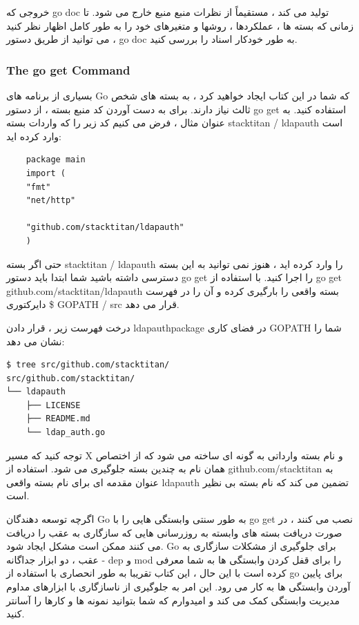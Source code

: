 \documentclass[12pt]{book}
\begin{document}
خروجی که go doc تولید می کند ، مستقیماً از نظرات منبع منبع خارج می شود.
تا زمانی که بسته ها ، عملکردها ، روشها و متغیرهای خود را به طور کامل اظهار نظر کنید ، می توانید از طریق دستور go doc به طور خودکار اسناد را بررسی کنید.
\subsubsection{The go get Command}
بسیاری از برنامه های Go که شما در این کتاب ایجاد خواهید کرد ، به بسته های شخص ثالث نیاز دارند.
برای به دست آوردن کد منبع بسته ، از دستور go get استفاده کنید.
به عنوان مثال ، فرض می کنیم کد زیر را که واردات بسته stacktitan / ldapauth است وارد کرده اید:
\begin{latin}
	\begin{lstlisting}
	package main
	import (
	"fmt"
	"net/http"

	"github.com/stacktitan/ldapauth"
	)
	\end{lstlisting}
\end{latin}

حتی اگر بسته stacktitan / ldapauth را وارد کرده اید ، هنوز نمی توانید به این بسته دسترسی داشته باشید
شما ابتدا باید دستور go get را اجرا کنید.
با استفاده از go get github.com/stacktitan/ldapauth بسته واقعی را بارگیری کرده و آن را در فهرست دایرکتوری \$ GOPATH / src قرار می دهد.

درخت فهرست زیر ، قرار دادن ldapauthpackage در فضای کاری GOPATH شما را نشان می دهد:
\begin{latin}
	\begin{lstlisting}
$ tree src/github.com/stacktitan/
src/github.com/stacktitan/
└── ldapauth
	├── LICENSE
	├── README.md
	└── ldap_auth.go
	\end{lstlisting}
\end{latin}

توجه کنید که مسیر X و نام بسته وارداتی به گونه ای ساخته می شود که از اختصاص همان نام به چندین بسته جلوگیری می شود.
استفاده از github.com/stacktitan به عنوان مقدمه ای برای نام بسته واقعی ldapauth تضمین می کند که نام بسته بی نظیر است.

اگرچه توسعه دهندگان Go به طور سنتی وابستگی هایی را با go get نصب می کنند ، در صورت دریافت بسته های وابسته به روزرسانی هایی که سازگاری به عقب را دریافت می کنند ممکن است مشکل ایجاد شود.
Go برای جلوگیری از مشکلات سازگاری به عقب ، دو ابزار جداگانه - dep و mod را برای قفل کردن وابستگی ها به شما معرفی کرده است
با این حال ، این کتاب تقریبا به طور انحصاری با استفاده از go برای پایین آوردن وابستگی ها به کار می رود.
این امر به جلوگیری از ناسازگاری با ابزارهای مداوم مدیریت وابستگی کمک می کند و امیدوارم که شما بتوانید نمونه ها و کارها را آسانتر کنید.
\end{document}
